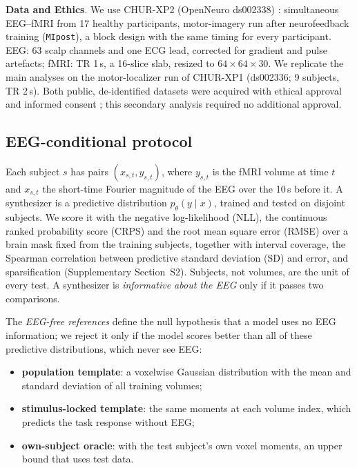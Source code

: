 
\textbf{Data and Ethics}. We use CHUR-XP2 (OpenNeuro ds002338) \citep{lioi2019simultaneous}: simultaneous EEG--fMRI from 17 healthy participants, motor-imagery run after neurofeedback training (\texttt{MIpost}), a block design with the same timing for every participant. EEG: 63 scalp channels and one ECG lead, corrected for gradient and pulse artefacts; fMRI: TR 1\,s, a 16-slice slab, resized to $64\times64\times30$. We replicate the main analyses on the motor-localizer run of CHUR-XP1 (ds002336; 9 subjects, TR 2\,s). Both public, de-identified datasets were acquired with ethical approval and informed consent \citep{lioi2019simultaneous}; this secondary analysis required no additional approval.

\subsection{EEG-conditional protocol}\label{sec:problem}

Each subject $s$ has pairs $(x_{s,t}, y_{s,t})$, where $y_{s,t}$ is the fMRI volume at time $t$ and $x_{s,t}$ the short-time Fourier magnitude of the EEG over the 10\,s before it. A synthesizer is a predictive distribution $p_\theta(y\mid x)$, trained and tested on disjoint subjects. We score it with the negative log-likelihood (NLL), the continuous ranked probability score (CRPS) \citep{gneiting2007strictly} and the root mean square error (RMSE) over a brain mask fixed from the training subjects, together with interval coverage, the Spearman correlation between predictive standard deviation (SD) and error, and sparsification (Supplementary Section~S2). Subjects, not volumes, are the unit of every test. A synthesizer is \emph{informative about the EEG} only if it passes two comparisons.

The \emph{EEG-free references} define the null hypothesis that a model uses no EEG information; we reject it only if the model scores better than all of these predictive distributions, which never see EEG:
\begin{itemize}
	\item \textbf{population template}: a voxelwise Gaussian distribution with the mean and standard deviation of all training volumes;
	\item \textbf{stimulus-locked template}: the same moments at each volume index, which predicts the task response without EEG;
	\item \textbf{own-subject oracle}: with the test subject's own voxel moments, an upper bound that uses test data.
\end{itemize}

